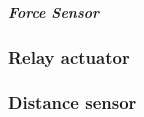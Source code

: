 

\subparagraph{Force Sensor}



\subsubsection{Relay actuator}




\subsubsection{Distance sensor}


